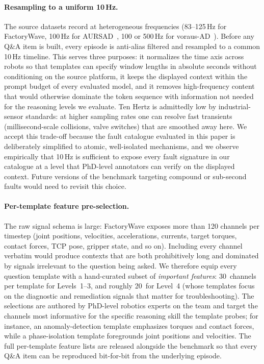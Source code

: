 \documentclass{article}
\begin{document}
\paragraph{Resampling to a uniform 10\,Hz.} The source datasets record at heterogeneous frequencies (83--125\,Hz for FactoryWave, 100\,Hz for AURSAD~\cite{leporowski2022aursad}, 100 or 500\,Hz for voraus-AD~\cite{brockmann2023vorausad}). Before any Q\&A item is built, every episode is anti-alias filtered and resampled to a common 10\,Hz timeline. This serves three purposes: it normalizes the time axis across robots so that templates can specify window lengths in absolute seconds without conditioning on the source platform, it keeps the displayed context within the prompt budget of every evaluated model, and it removes high-frequency content that would otherwise dominate the token sequence with information not needed for the reasoning levels we evaluate. Ten Hertz is admittedly low by industrial-sensor standards: at higher sampling rates one can resolve fast transients (millisecond-scale collisions, valve switches) that are smoothed away here. We accept this trade-off because the fault catalogue evaluated in this paper is deliberately simplified to atomic, well-isolated mechanisms, and we observe empirically that 10\,Hz is sufficient to expose every fault signature in our catalogue at a level that PhD-level annotators can verify on the displayed context. Future versions of the benchmark targeting compound or sub-second faults would need to revisit this choice.

\paragraph{Per-template feature pre-selection.} The raw signal schema is large: FactoryWave exposes more than 120 channels per timestep (joint positions, velocities, accelerations, currents, target torques, contact forces, TCP pose, gripper state, and so on). Including every channel verbatim would produce contexts that are both prohibitively long and dominated by signals irrelevant to the question being asked. We therefore equip every question template with a hand-curated subset of \emph{important features}: 30~channels per template for Levels~1--3, and roughly 20~for Level~4 (whose templates focus on the diagnostic and remediation signals that matter for troubleshooting). The selections are authored by PhD-level robotics experts on the team and target the channels most informative for the specific reasoning skill the template probes; for instance, an anomaly-detection template emphasizes torques and contact forces, while a phase-isolation template foregrounds joint positions and velocities. The full per-template feature lists are released alongside the benchmark so that every Q\&A item can be reproduced bit-for-bit from the underlying episode.
\end{document}
